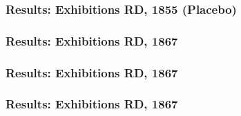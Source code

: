 \documentclass[10pt]{beamer}
\begin{document}

\begin{frame}
    \frametitle{Results: Exhibitions RD, 1855 (Placebo)}

    \centering
    \begin{minipage}{.75\textwidth}
        
    \end{minipage}
    
\end{frame}

\begin{frame}
    \frametitle{Results: Exhibitions RD, 1867}

    \centering
    \begin{minipage}{.75\textwidth}
        
%        
    \end{minipage}
    
\end{frame}

\begin{frame}
    \frametitle{Results: Exhibitions RD, 1867}

    \centering
    \begin{minipage}{.75\textwidth}
        
%        
    \end{minipage}
    
\end{frame}

\begin{frame}
    \frametitle{Results: Exhibitions RD, 1867}

    \centering
    \begin{minipage}{.75\textwidth}
        
%        
    \end{minipage}
    
\end{frame}
\end{document}

